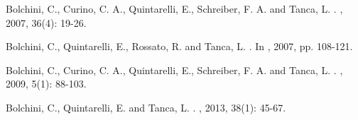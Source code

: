 \documentclass[format=acmsmall, review=false, screen=true]{acmart}
\newcommand{\ignore}[1]{}
\begin{document}
\begin{thebibliography}{1}






\ignore{
\bibitem[Bolchini et al.(2007a)]{bolchini}
Bolchini, C., Schreiber, F. and Tanca, L.
\newblock{A Methodology for a Very Small Data Base Design}.
\newblock{\em Information Systems}, 2007, 32(1): 61-82.}


Bolchini, C., Curino, C. A., Quintarelli, E., Schreiber, F. A. and Tanca, L.
.
, 2007, 36(4): 19-26.

Bolchini, C., Quintarelli, E., Rossato, R. and Tanca, L.
.
In , 2007, pp. 108-121.


Bolchini, C., Curino, C. A., Quintarelli, E., Schreiber, F. A. and Tanca, L.
.
, 2009, 5(1): 88-103.

Bolchini, C., Quintarelli, E. and Tanca, L.
.
, 2013, 38(1): 45-67.


\end{thebibliography}
\end{document}
